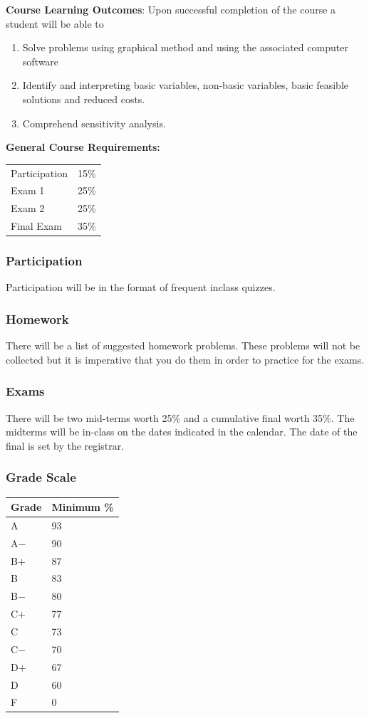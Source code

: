 \documentclass[11pt]{article}
\begin{document}
{\bf Course Learning Outcomes}: Upon successful completion of the course a student will be able to 
\begin{enumerate}[---]
\item Solve problems using graphical method and using the associated computer software
\item Identify and interpreting basic variables, non-basic variables, basic feasible solutions and reduced costs. 
\item Comprehend sensitivity analysis.
\end{enumerate}

{\bf General Course Requirements:} 
\begin{center}
{\renewcommand{\arraystretch}{1.2}%
\begin{tabular}{|l|r|}
\hline
Participation & 15\%\\
Exam 1& 25\% \\
Exam 2& 25\% \\
Final Exam& 35\% \\
\hline
\end{tabular}}
\end{center}
\subsubsection*{Participation}
Participation will be in the format of frequent inclass quizzes. 
\subsubsection*{Homework}
There will be a list of suggested homework problems. These problems will not be collected but it is imperative that you do them in order to practice for the exams. 
\subsubsection*{Exams}
There will be two mid-terms worth 25\% and a cumulative final worth 35\%. The midterms will be in-class on the dates indicated in the calendar. The date of the final is set by the registrar. 
\subsubsection*{Grade Scale}
\begin{center}
{\renewcommand{\arraystretch}{1.2}%
\begin{tabular}{|l|l|}
\hline
Grade & Minimum \%\\
\hline
 A& 93\\
 A$-$& 90\\
 B$+$& 87\\
  B& 83\\
 B$-$& 80\\
C$+$& 77\\
 C& 73\\
 C$-$& 70\\
 D$+$& 67\\
 D& 60\\
 F& 0\\
\hline
\end{tabular}}
\end{center}
\end{document}
